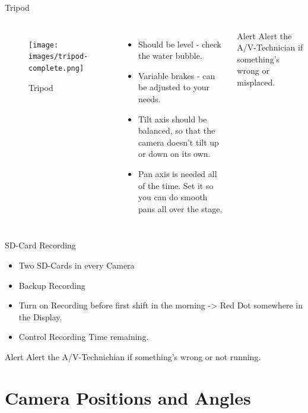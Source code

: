 \documentclass[aspectratio=169]{beamer}
\begin{document}
\begin{frame}{Tripod}
	\begin{columns}[T,onlytextwidth]
	\begin{figure} 
		\centering
		\texttt{[image: images/tripod-complete.png]}
		\caption{Tripod}
	\end{figure}
	
	\begin{itemize}
			\item Should be level - check the water bubble.
			\item Variable brakes - can be adjusted to your needs.
			\item Tilt axis should be balanced, so that the camera doesn't tilt up or down on its own.
			\item Pan axis is needed all of the time. Set it so you can do smooth pans all over the stage.
		\end{itemize}
		\begin{alertblock}{Alert}
			Alert the A/V-Technician if something's wrong or misplaced.
		\end{alertblock}
	\end{columns}
\end{frame}

\begin{frame}{SD-Card Recording}
		\begin{itemize}
			\item Two SD-Cards in every Camera
			\item Backup Recording
			\item Turn on Recording before first shift in the morning -> Red Dot somewhere in the Display.
			\item Control Recording Time remaining. 
		\end{itemize}
		\begin{alertblock}{Alert}
			Alert the A/V-Technichian if something's wrong or not running.
		\end{alertblock}
\end{frame}

\section{Camera Positions and Angles}
\end{document}
